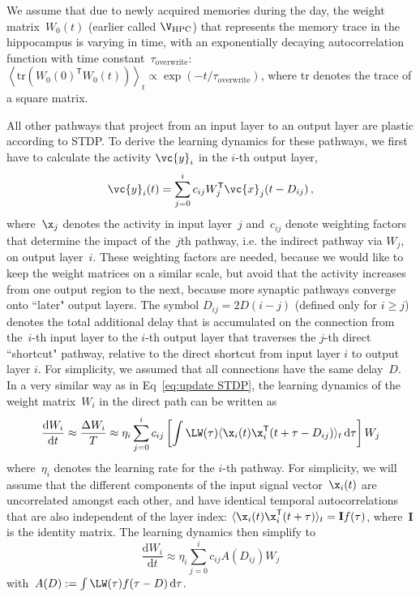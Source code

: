 We assume that due to newly acquired memories during the day, the weight matrix~$W_0(t)$ (earlier called $\V_{\rm HPC}$) that represents the memory trace in the hippocampus is varying in time, with an exponentially decaying autocorrelation function with time constant~$\tau_{\textrm{overwrite}}$: $\left\langle \mathrm{tr}\left(W_0(0)^\mathsf{T} W_0(t)\right)\right\rangle_t \propto \exp(-t/\tau_{\textrm{overwrite}})$, where $\mathrm{tr}$ denotes the trace of a square matrix.

All other pathways that project from an input layer to an output layer are plastic according to STDP. To derive the learning dynamics for these pathways, we first have to calculate the activity $\vc{y}_i$ in the $i$-th output layer,
\begin{equation}
\vc{y}_i(t) = \sum_{j=0}^{i}c_{ij}  W_j^\mathsf{T} \vc{x}_j(t-D_{ij}) \,,
\end{equation}
where~$\x_j$ denotes the activity in input layer~$j$ and~$c_{ij}$ denote weighting factors that determine the impact of the~$j$th pathway, i.e. the indirect pathway via $W_j$, on output layer~$i$. These weighting factors are needed, because we would like to keep the weight matrices on a similar scale, but avoid that the activity increases from one output region to the next, because more synaptic pathways converge onto ``later" output layers. The symbol $D_{ij} = 2 D (i-j)$ (defined only for $i \ge j$) denotes the total additional delay that is accumulated on the connection from the~$i$-th input layer to the $i$-th output layer that traverses the $j$-th direct ``shortcut" pathway, relative to the direct shortcut from input layer $i$ to output layer $i$. For simplicity, we assumed that all connections have the same delay~$D$. In a very similar way as in Eq~\eqref{eq:update STDP}, the learning dynamics of the weight matrix~$W_i$ in the direct path can be written as
\begin{equation}
\frac{\mathrm{d} W_i}{\mathrm{d}t} \approx \frac{\Delta W_i}{T} \approx \eta_i \sum_{j=0}^i c_{ij} \left[\int \LW(\tau) \langle \x_i(t) \x_i^\mathsf{T}(t+\tau-D_{ij})\rangle_t \, \mathrm{d}\tau\right] W_j
\end{equation}
where~$\eta_i$ denotes the learning rate for the $i$-th pathway. For simplicity, we will assume that the different components of the input signal vector~$\x_i(t)$ are uncorrelated amongst each other, and have identical temporal autocorrelations that are also independent of the layer index: $\langle \x_i(t) \x_i^\mathsf{T}(t+\tau)\rangle_t = \mathbf{I} f(\tau)$, where~$\mathbf{I}$ is the identity matrix. The learning dynamics then simplify to
\begin{equation}
\frac{\mathrm{d} W_i}{\mathrm{d} t} \approx \eta_i \sum_{j=0}^i c_{ij} A(D_{ij}) W_j
\end{equation}
with~$A(D):=\int \LW(\tau) f(\tau-D)\, \mathrm{d}\tau$.

